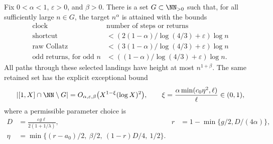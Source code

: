 \begin{proposition}
\label{prop:Shaik-graded-quantitative}
Fix \(0<\alpha<1\), \(\varepsilon>0\), and \(\beta>0\).
There is a set \(G\subset\NN_{>0}\) such that, for all sufficiently
large \(n\in G\), the target \(n^\alpha\) is attained with the bounds
\begin{equation}\label{eq:Shaik-graded-clocks}
\begin{array}{c|c}
 \text{clock} & \text{number of steps or returns}\\ \hline
 \text{shortcut} &
  <(2(1-\alpha)/\log(4/3)+\varepsilon)\log n\\
 \text{raw Collatz} &
  <(3(1-\alpha)/\log(4/3)+\varepsilon)\log n\\
 \text{odd returns, for odd }n &
  <((1-\alpha)/\log(4/3)+\varepsilon)\log n .
\end{array}
\end{equation}
All paths through these selected landings have height at most
\(n^{1+\beta}\). The same retained set has the explicit exceptional bound
\begin{equation}\label{eq:Shaik-graded-rate}
 |[1,X]\cap\NN\setminus G|
   =O_{\alpha,\varepsilon,\beta}\bigl(X^{1-\xi}(\log X)^2\bigr),
 \qquad
 \xi=\frac{\alpha\min(c_0\eta^2,\ell)}{\ell}\in(0,1),
\end{equation}
where a permissible parameter choice is
\begin{align}
 D&=\frac{\varepsilon g\ell}{2(1+1/\lambda)},&
 r&=1-\min\{g/2,D/(4\alpha)\},\label{eq:Shaik-graded-parameters}\\
 \eta&=\min\{(r-a_0)/2,\ \beta/2,\ (1-r)D/4,\ 1/2\}.\nonumber
\end{align}
\end{proposition}
